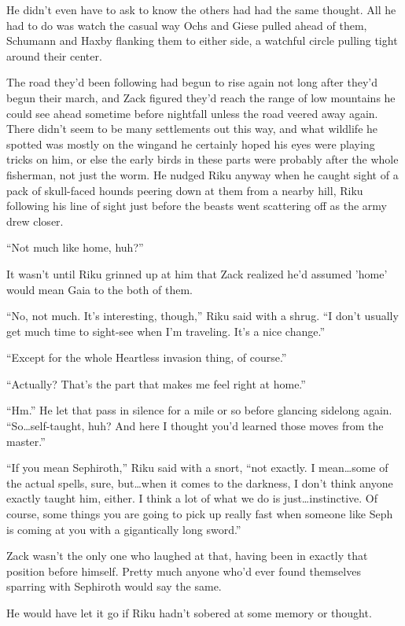 He didn't even have to ask to know the others had had the same thought. All he had to do was watch the casual way Ochs and Giese pulled ahead of them, Schumann and Haxby flanking them to either side, a watchful circle pulling tight around their center.

The road they'd been following had begun to rise again not long after they'd begun their march, and Zack figured they'd reach the range of low mountains he could see ahead sometime before nightfall unless the road veered away again. There didn't seem to be many settlements out this way, and what wildlife he spotted was mostly on the wing\textemdash and he certainly hoped his eyes were playing tricks on him, or else the early birds in these parts were probably after the whole fisherman, not just the worm. He nudged Riku anyway when he caught sight of a pack of skull-faced hounds peering down at them from a nearby hill, Riku following his line of sight just before the beasts went scattering off as the army drew closer.

``Not much like home, huh?''

It wasn't until Riku grinned up at him that Zack realized he'd assumed 'home' would mean Gaia to the both of them.

``No, not much. It's interesting, though,'' Riku said with a shrug. ``I don't usually get much time to sight-see when I'm traveling. It's a nice change.''

``Except for the whole Heartless invasion thing, of course.''

``Actually? That's the part that makes me feel right at home.''

``Hm.'' He let that pass in silence for a mile or so before glancing sidelong again. ``So\ldots self-taught, huh? And here I thought you'd learned those moves from the master.''

``If you mean Sephiroth,'' Riku said with a snort, ``not exactly. I mean\ldots some of the actual spells, sure, but\ldots when it comes to the darkness, I don't think anyone exactly taught him, either. I think a lot of what we do is just\ldots instinctive. Of course, some things you are going to pick up really fast when someone like Seph is coming at you with a gigantically long sword.''

Zack wasn't the only one who laughed at that, having been in exactly that position before himself. Pretty much anyone who'd ever found themselves sparring with Sephiroth would say the same.

He would have let it go if Riku hadn't sobered at some memory or thought.

